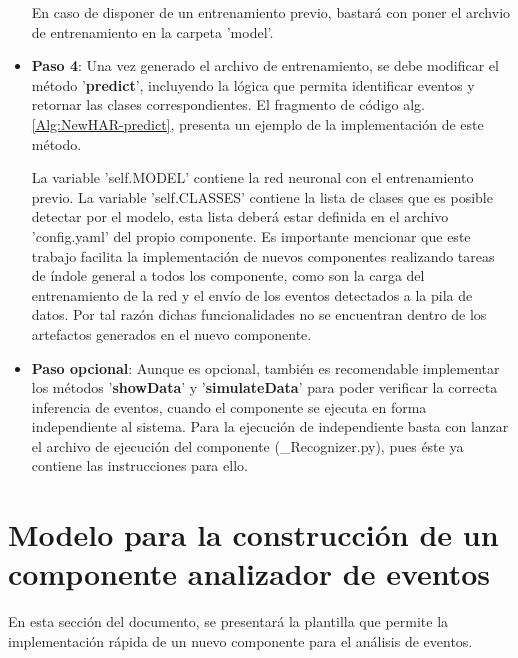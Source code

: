 \begin{itemize}
            En caso de disponer de un entrenamiento previo, bastará con poner el archvio de entrenamiento en la carpeta 'model'.
            
            \item \textbf{Paso 4}: Una vez generado el archivo de entrenamiento, se debe modificar el método '\textbf{predict}', incluyendo la lógica que permita identificar eventos y retornar las clases correspondientes. El fragmento de código alg. \ref{Alg:NewHAR-predict}, presenta un ejemplo de la implementación de este método.

            
            
            La variable 'self.MODEL' contiene la red neuronal con el entrenamiento previo. La variable 'self.CLASSES' contiene la lista de clases que es posible detectar por el modelo, esta lista deberá estar definida en el archivo 'config.yaml' del propio componente. Es importante mencionar que este trabajo facilita la implementación de nuevos componentes realizando tareas de índole general a todos los componente, como son la carga del entrenamiento de la red y el envío de los eventos detectados a la pila de datos. Por tal razón dichas funcionalidades no se encuentran dentro de los artefactos generados en el nuevo componente.
            
            \item \textbf{Paso opcional}: Aunque es opcional, también es recomendable implementar los métodos '\textbf{showData}' y '\textbf{simulateData}' para poder verificar la correcta inferencia de eventos, cuando el componente se ejecuta en forma independiente al sistema. Para la ejecución de independiente basta con lanzar el archivo de ejecución del componente (\_Recognizer.py), pues éste ya contiene las instrucciones para ello.
            
        \end{itemize}
        
    \newpage
    
\section{Modelo para la construcción de un componente analizador de eventos}
\label{Sec:EventAnalyzerTemplate}
    En esta sección del documento, se presentará la plantilla que permite la implementación rápida de un nuevo componente para el análisis de eventos.

